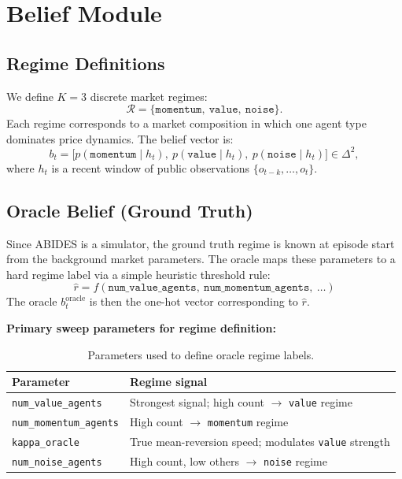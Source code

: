 \documentclass[11pt]{article}
\begin{document}
\section{Belief Module}
\label{sec:belief}

\subsection{Regime Definitions}

We define $K = 3$ discrete market regimes:
\[
\mathcal{R} = \{\texttt{momentum},\ \texttt{value},\ \texttt{noise}\}.
\]
Each regime corresponds to a market composition in which one agent type dominates price dynamics.
The belief vector is:
\[
b_t = \bigl[p(\texttt{momentum} \mid h_t),\ p(\texttt{value} \mid h_t),\ p(\texttt{noise} \mid h_t)\bigr] \in \Delta^2,
\]
where $h_t$ is a recent window of public observations $\{o_{t-k}, \ldots, o_t\}$.

\subsection{Oracle Belief (Ground Truth)}

Since ABIDES is a simulator, the ground truth regime is known at episode start from the background
market parameters. The oracle maps these parameters to a hard regime label via a simple heuristic
threshold rule:
\[
\hat{r} = f(\texttt{num\_value\_agents},\ \texttt{num\_momentum\_agents},\ \ldots)
\]
The oracle $b_t^{\text{oracle}}$ is then the one-hot vector corresponding to $\hat{r}$.

\textbf{Primary sweep parameters for regime definition:}

\begin{table}[h]
\centering
\begin{tabular}{ll}
\toprule
\textbf{Parameter} & \textbf{Regime signal} \\
\midrule
\texttt{num\_value\_agents} & Strongest signal; high count $\to$ \texttt{value} regime \\
\texttt{num\_momentum\_agents} & High count $\to$ \texttt{momentum} regime \\
\texttt{kappa\_oracle} & True mean-reversion speed; modulates \texttt{value} strength \\
\texttt{num\_noise\_agents} & High count, low others $\to$ \texttt{noise} regime \\
\bottomrule
\end{tabular}
\caption{Parameters used to define oracle regime labels.}
\end{table}
\end{document}
